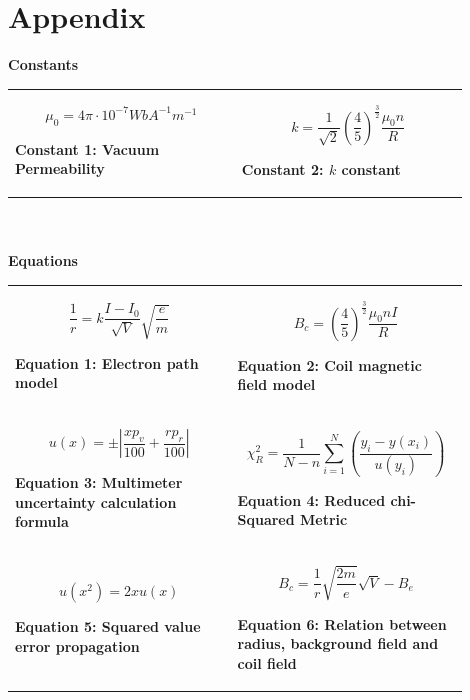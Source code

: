\documentclass[
	letterpaper, %
	10pt, %
]{CSUniSchoolLabReport}
\begin{document}
\section{Appendix}
{\Large\textbf{Constants}}\\
\begin{tabular}{p{0.45\linewidth} p{0.45\linewidth}}

$$ \mu_0= 4\pi \cdot 10^{-7}WbA^{-1}m^{-1}$$
\begin{center}
	\textbf{Constant 1: Vacuum Permeability}
\end{center}
&
$$k=\frac{1}{\sqrt 2}\left(\frac{4}{5}\right)^{\frac{3}{2}}\frac{\mu_0n}{R}$$
\begin{center}
	\textbf{Constant 2: $k$ constant}
\end{center}
\end{tabular}\\\\
{\Large\textbf{Equations}}\\
\begin{tabular}{p{0.45\linewidth} p{0.45\linewidth}}

$$\frac{1}{r}=k\frac{I-I_0}{\sqrt V}\sqrt{\frac{e}{m}}$$
\begin{center}
	\textbf{Equation 1: Electron path model}
\end{center}
&
$$B_c = \left(\frac45\right)^{\frac32} \frac{\mu_0nI}{R}$$
\begin{center}
	\textbf{Equation 2: Coil magnetic field model}
\end{center}
\\
$$ u(x) = \pm\left|\frac{xp_v}{100} + \frac{rp_r}{100}\right|$$
\begin{center}
	\textbf{Equation 3: Multimeter uncertainty calculation formula}
\end{center}
&
$$\chi^2_R = \frac{1}{N-n}\sum_{i=1}^N\left(\frac{y_i-y(x_i)}{u(y_i)}\right)$$
\begin{center}
	\textbf{Equation 4: Reduced chi-Squared Metric}
\end{center}\\
$$u(x^2) = 2xu(x)$$
\begin{center}
	\textbf{Equation 5: Squared value error propagation}
\end{center}
&
$$B_c =\frac 1r \sqrt{\frac{2m}{e}} \sqrt V  - B_e$$
\begin{center}
	\textbf{Equation 6: Relation between radius, background field and coil field}
\end{center}
\end{tabular}\\
\end{document}
